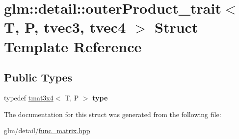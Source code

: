 \hypertarget{structglm_1_1detail_1_1outerProduct__trait_3_01T_00_01P_00_01tvec3_00_01tvec4_01_4}{\section{glm\-:\-:detail\-:\-:outer\-Product\-\_\-trait$<$ T, P, tvec3, tvec4 $>$ Struct Template Reference}
\label{structglm_1_1detail_1_1outerProduct__trait_3_01T_00_01P_00_01tvec3_00_01tvec4_01_4}
}
\subsection*{Public Types}
\begin{DoxyCompactItemize}
\item 
\hypertarget{structglm_1_1detail_1_1outerProduct__trait_3_01T_00_01P_00_01tvec3_00_01tvec4_01_4_a14958bc1241fffaf223abab70496c56d}{typedef \hyperlink{structglm_1_1tmat3x4}{tmat3x4}$<$ T, P $>$ {\bfseries type}}\label{structglm_1_1detail_1_1outerProduct__trait_3_01T_00_01P_00_01tvec3_00_01tvec4_01_4_a14958bc1241fffaf223abab70496c56d}

\end{DoxyCompactItemize}


The documentation for this struct was generated from the following file\-:\begin{DoxyCompactItemize}
\item 
glm/detail/\hyperlink{func__matrix_8hpp}{func\-\_\-matrix.\-hpp}\end{DoxyCompactItemize}
